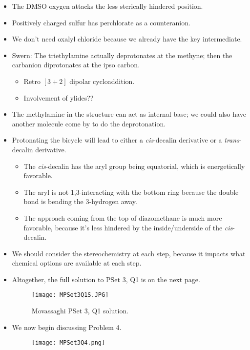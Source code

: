 \documentclass[../notes.tex]{subfiles}
\begin{document}
\begin{itemize}
\begin{itemize}
    \end{itemize}
    \item The DMSO oxygen attacks the less sterically hindered position.
    \item Positively charged sulfur has perchlorate as a counteranion.
    \item We don't need oxalyl chloride because we already have the key intermediate.
    \item Swern: The triethylamine actually deprotonates at the methyne; then the carbanion diprotonates at the ipso carbon.
    \begin{itemize}
        \item Retro $[3+2]$ dipolar cycloaddition.
        \item Involvement of ylides??
    \end{itemize}
    \item The methylamine in the structure can act as internal base; we could also have another molecule come by to do the deprotonation.
    \item Protonating the bicycle will lead to either a \emph{cis}-decalin derivative or a \emph{trans}-decalin derivative.
    \begin{itemize}
        \item The \emph{cis}-decalin has the aryl group being equatorial, which is energetically favorable.
        \item The aryl is not 1,3-interacting with the bottom ring because the double bond is bending the 3-hydrogen away.
        \item The approach coming from the top of diazomethane is much more favorable, because it's less hindered by the inside/underside of the \emph{cis}-decalin.
    \end{itemize}
    \item We should consider the stereochemistry at each step, because it impacts what chemical options are available at each step.
    \item Altogether, the full solution to PSet 3, Q1 is on the next page.
    \begin{figure}[H]
        \centering
        \texttt{[image: MPSet3Q1S.JPG]}
        \caption{Movassaghi PSet 3, Q1 solution.}
        \label{fig:MPSet3Q1S}
    \end{figure}
    \pagebreak
    \item We now begin discussing Problem 4.
    \begin{figure}[h!]
        \centering
        \texttt{[image: MPSet3Q4.png]}

\end{figure}
\end{itemize}
\end{document}
